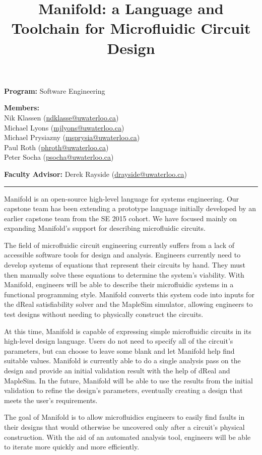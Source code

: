 \documentclass[12pt]{article}
\title{Manifold: a Language and Toolchain for Microfluidic Circuit Design}
\author{}
\date{\vspace{-10ex}}
\begin{document}
\maketitle

{\bf Program:} Software Engineering

{\bf Members:} \\
Nik Klassen (\url{ndklasse@uwaterloo.ca}) \\
Michael Lyons (\url{mjlyons@uwaterloo.ca}) \\
Michael Prysiazny (\url{msprysia@uwaterloo.ca}) \\
Paul Roth (\url{phroth@uwaterloo.ca}) \\
Peter Socha (\url{psocha@uwaterloo.ca})

{\bf Faculty Advisor:} Derek Rayside (\url{drayside@uwaterloo.ca})

\rule{\textwidth}{1pt}



Manifold is an open-source high-level language for systems engineering.
Our capstone team has been extending a prototype language initially developed by an earlier capstone team from the SE 2015 cohort.
We have focused mainly on expanding Manifold's support for describing microfluidic circuits.

The field of microfluidic circuit engineering currently suffers from a lack of accessible software tools for design and analysis.
Engineers currently need to develop systems of equations that represent their circuits by hand.
They must then manually solve these equations to determine the system's viability.
With Manifold, engineers will be able to describe their microfluidic systems in a functional programming style.
Manifold converts this system code into inputs for the dReal satisfiability solver and the MapleSim simulator, allowing engineers to test designs without needing to physically construct the circuits.


At this time, Manifold is capable of expressing simple microfluidic circuits in its high-level design language.
Users do not need to specify all of the circuit's parameters, but can choose to leave some blank and let Manifold help find suitable values.
Manifold is currently able to do a single analysis pass on the design and provide an initial validation result with the help of dReal and MapleSim.
In the future, Manifold will be able to use the results from the initial validation to refine the design's parameters, eventually creating a design that meets the user's requirements.

The goal of Manifold is to allow microfluidics engineers to easily find faults in their designs that would otherwise be uncovered only after a circuit's physical construction.
With the aid of an automated analysis tool, engineers will be able to iterate more quickly and more efficiently.
\end{document}
